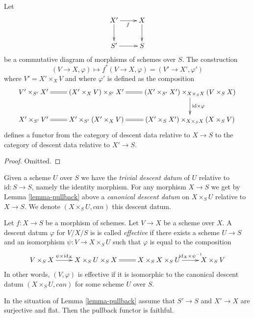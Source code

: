 \begin{lemma}
\label{lemma-pullback}
Let
$$
\xymatrix{
X' \ar[r]_f \ar[d] & X \ar[d] \\
S' \ar[r] & S
}
$$
be a commutative diagram of morphisms of schemes over $S$.
The construction
$$
(V \to X, \varphi) \longmapsto f^*(V \to X, \varphi) = (V' \to X', \varphi')
$$
where $V' = X' \times_X V$ and where
$\varphi'$ is defined as the composition
$$
\xymatrix{
V' \times_{S'} X' \ar@{=}[r] &
(X' \times_X V) \times_{S'} X' \ar@{=}[r] &
(X' \times_{S'} X') \times_{X \times_S X} (V \times_S X)
\ar[d]^{\text{id} \times \varphi} \\
X' \times_{S'} V' \ar@{=}[r] &
X' \times_{S'} (X' \times_X V) &
(X' \times_S X') \times_{X \times_S X} (X \times_S V) \ar@{=}[l]
}
$$
defines a functor from the category of descent data
relative to $X \to S$ to the category of descent data
relative to $X' \to S$.
\end{lemma}

\begin{proof}
Omitted.
\end{proof}

\noindent
Given a scheme $U$ over $S$ we have the {\it trivial
descent datum} of $U$ relative to $\text{id} : S \to S$,
namely the identity morphism.
For any morphism $X \to S$ we get by Lemma \ref{lemma-pullback} above
a {\it canonical descent datum} on $X \times_S U$
relative to $X \to S$. We denote $(X \times_S U, can)$ this descent datum.

\begin{definition}
\label{definition-effective}
Let $f : X \to S$ be a morphism of schemes.
Let $V \to X$ be a scheme over $X$.
A descent datum $\varphi$ for $V/X/S$ is
is called {\it effective} if there exists a 
scheme $U \to S$ and an isomorphism $\psi : V \to X \times_S U$
such that $\varphi$ is equal to the composition
$$
\xymatrix{
V \times_S X \ar[r]^-{\psi \times \text{id}_X} &
X \times_S U \times_S X \ar@{=}[r] &
X \times_S X \times_S U 
\ar[r]^-{\text{id}_X \times \psi^{-1}} &
X \times_S V
}
$$
In other words, $(V, \varphi)$ is effective if it is
isomorphic to the canonical descent datum
$(X \times_S U, can)$ for some scheme $U$ over $S$.
\end{definition}

\begin{lemma}
\label{lemma-faithful}
In the situation of Lemma \ref{lemma-pullback}
assume that $S' \to S$ and $X' \to X$ are surjective
and flat. Then the pullback functor is faithful.
\end{lemma}

